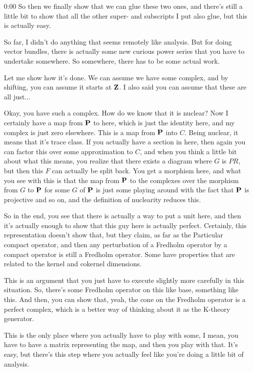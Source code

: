 \begin{unfinished}{0:00}
So then we finally show that we can glue these two ones, and there's still a little bit to show that all the other super- and subscripts I put also glue, but this is actually easy.

So far, I didn't do anything that seems remotely like analysis. But for doing vector bundles, there is actually some new curious power series that you have to undertake somewhere. So somewhere, there has to be some actual work.

Let me show how it's done. We can assume we have some complex, and by shifting, you can assume it starts at $\Z$. I also said you can assume that these are all just...

Okay, you have such a complex. How do we know that it is nuclear? Now I certainly have a map from $\P$ to here, which is just the identity here, and my complex is just zero elsewhere. This is a map from $\P$ into $C$. Being nuclear, it means that it's trace class. If you actually have a section in here, then again you can factor this over some approximation to $C$, and when you think a little bit about what this means, you realize that there exists a diagram where $G$ is $PR$, but then this $F$ can actually be split back. You get a morphism here, and what you see with this is that the map from $\P$ to the complexes over the morphism from $G$ to $\P$ for some $G$ of $\P$ is just some playing around with the fact that $\P$ is projective and so on, and the definition of nuclearity reduces this.

So in the end, you see that there is actually a way to put a unit here, and then it's actually enough to show that this guy here is actually perfect. Certainly, this representation doesn't show that, but they claim, as far as the
Particular compact operator, and then any perturbation of a Fredholm operator by a compact operator is still a Fredholm operator. Some have properties that are related to the kernel and cokernel dimensions.

This is an argument that you just have to execute slightly more carefully in this situation. So, there's some Fredholm operator on this like base, something like this. And then, you can show that, yeah, the cone on the Fredholm operator is a perfect complex, which is a better way of thinking about it as the K-theory generator.

This is the only place where you actually have to play with some, I mean, you have to have a matrix representing the map, and then you play with that. It's easy, but there's this step where you actually feel like you're doing a little bit of analysis.


\end{unfinished}
